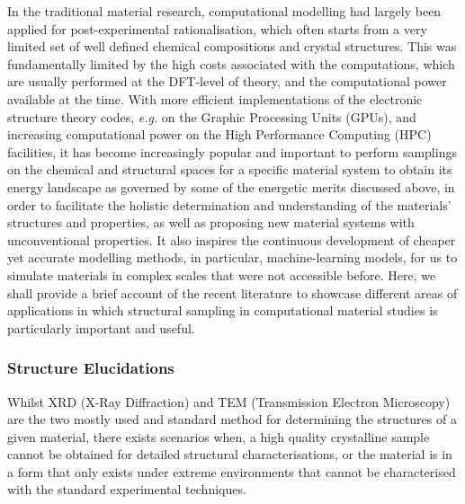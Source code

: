 
In the traditional material  research, computational modelling had largely been applied for post-experimental rationalisation, which often starts from a very limited set of well defined chemical compositions and crystal structures. This was fundamentally limited by the high  costs associated with the computations, which are usually performed at the DFT-level of theory, and the computational power available at the time. With  more efficient implementations of the electronic structure theory codes, \emph{e.g.} on the Graphic Processing  Units (GPUs)\cite{hutchinson2012vasp,maintz2018strategies}, and increasing computational power on the  High Performance Computing (HPC) facilities, it has become increasingly popular and important to perform  samplings on the chemical and structural spaces for a specific material system to obtain its energy landscape as governed by some of the energetic merits discussed above, in order to facilitate the holistic determination and understanding of the materials' structures and properties, as well as proposing new material systems with unconventional properties. It also inspires the continuous development of cheaper yet accurate modelling methods, in particular, machine-learning models, for us to simulate materials in complex scales that were not accessible before. Here, we shall provide a brief account of the recent literature to showcase different areas of applications in which structural sampling in computational material studies is particularly important and useful.

\subsubsection{Structure Elucidations} Whilst XRD (X-Ray Diffraction) and TEM (Transmission Electron Microscopy) are the two mostly used and standard method for determining the structures of a given material, there exists scenarios when, a high quality crystalline sample cannot be obtained for detailed structural characterisations, or the material is in a form that only exists under extreme environments that cannot be characterised with the standard experimental techniques.

